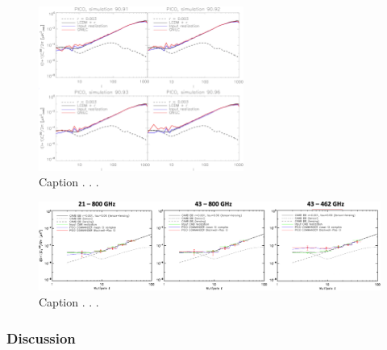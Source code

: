 \documentclass[PICOReport.tex]{subfiles}
\begin{document}
\begin{figure}
\hspace{-0.1in}
\parbox{4.0in}{\centerline {
\includegraphics[width=0.6\textwidth]{images/mathieu_GNILC_foregrounds.png}}}
\hspace{0.in}
\parbox{2.0in}{
\caption{Caption . . . 
\label{fig:gnilc} } }
\vspace{-0.1in}
\end{figure}

\begin{figure}
\begin{center}
\includegraphics[width=\textwidth]{images/commander_foregrounds_BB.png}
\vspace{-0.1in}
\caption{Caption . . . }
\label{fig:commander}
\end{center}
\end{figure}


\subsubsection{Discussion}
\end{document}
